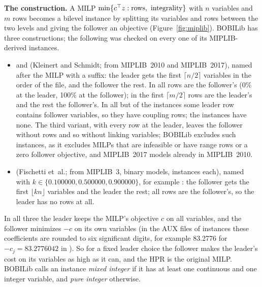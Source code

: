 \textbf{The construction.} A MILP $\min\{c\T z: \text{rows},\ \text{integrality}\}$ with $n$
variables and $m$ rows becomes a bilevel instance by splitting its variables and rows between the
two levels and giving the follower an objective (Figure~\ref{fig:miplib}). BOBILib has three
constructions; the following was checked on every one of its \NumMiplibDerived{}
MIPLIB-derived instances.
\begin{itemize}\setlength{\emergencystretch}{3em}
\item {} and  (Kleinert and Schmidt;\cite{kleinert2021computing}
from MIPLIB~2010 and MIPLIB~2017\cite{koch2011miplib,gleixner2021miplib}), named after the MILP
with a suffix: the leader gets the first $\lceil n/2\rceil$ variables in the order of the file,
and the follower the rest. In  all rows are the follower's (0\% at the leader,
100\% at the follower); in  the first $\lceil m/2\rceil$ rows are the leader's
and the rest the follower's. In all but \NumFiftyFiftyUncoupled{} of the  instances some leader row
contains follower variables, so they have coupling rows; the  instances have none.
The third variant, with every row at the leader, leaves the follower without rows and so
without linking variables; BOBILib excludes such instances, as it excludes MILPs that are
infeasible or have range rows or a zero follower objective, and MIPLIB~2017 models already in
MIPLIB~2010.\cite{thurauf2026bobilib}
\item {} (Fischetti et~al.;\cite{fischetti2016intersection,fischetti2018intersection}
from MIPLIB~3,\cite{bixby1998miplib} \NumMiplibThreeModels{} binary models, \NumMiplibThreePerModel{} instances each),
named  with $k\in\{0.100000,0.500000,0.900000\}$, for example :
the follower gets the first $\lfloor kn\rfloor$ variables and the leader the rest; all rows are
the follower's, so the leader has no rows at all.
\end{itemize}
In all three the leader keeps the MILP's objective $c$ on all variables, and the follower
minimizes $-c$ on its own variables (in the AUX files of \NumAuxRounded{} instances these coefficients are
rounded to six significant digits, for example 83.2776 for $-c_j=83.2776042$ in
). So for a fixed leader choice the follower makes the leader's cost on
its variables as high as it can, and the HPR is the original MILP. BOBILib calls an instance
\emph{mixed integer} if it has at least one continuous and one integer variable, and \emph{pure
integer} otherwise.

